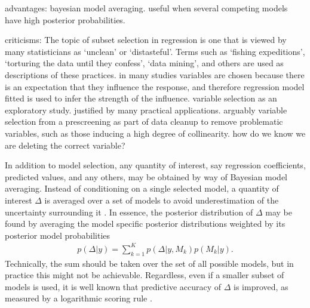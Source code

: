 \documentclass[a4paper,showframe,11pt]{report}
\begin{document}
advantages: bayesian model averaging. useful when several competing models have high posterior probabilities.

criticisms: The topic of subset selection in regression is one that is viewed by many statisticians as ‘unclean’ or ‘distasteful’. Terms such as ‘fishing expeditions’, ‘torturing the data until they confess’, ‘data mining’, and others are used as descriptions of these practices. \citep{miller2002subset}
in many studies variables are chosen because there is an expectation that they influence the response, and therefore regression model fitted is used to infer the strength of the influence.
variable selection as an exploratory study. justified by many practical applications.
arguably variable selection from a prescreening as part of data cleanup to remove problematic variables, such as those inducing a high degree of collinearity. how do we know we are deleting the correct variable?

In addition to model selection, any quantity of interest, say regression coefficients, predicted values, and any others, may be obtained by way of Bayesian model averaging.
Instead of conditioning on a single selected model, a quantity of interest $\Delta$ is averaged over a set of models to avoid underestimation of the uncertainty surrounding it \citep{madigan1994model}.
In essence, the posterior distribution of $\Delta$ may be found by averaging the model specific posterior distributions weighted by its posterior model probabilities
\begin{align}\label{eq:bma}
  p(\Delta|y) = \sum_{k=1}^K p(\Delta|y,M_k)p(M_k|y).
\end{align}
Technically, the sum should be taken over the set of all possible models, but in practice this might not be achievable.
Regardless, even if a smaller subset of models is used, it is well known that predictive accuracy of $\Delta$ is improved, as measured by a logarithmic scoring rule \citep{raftery1997bayesian}.
\end{document}
